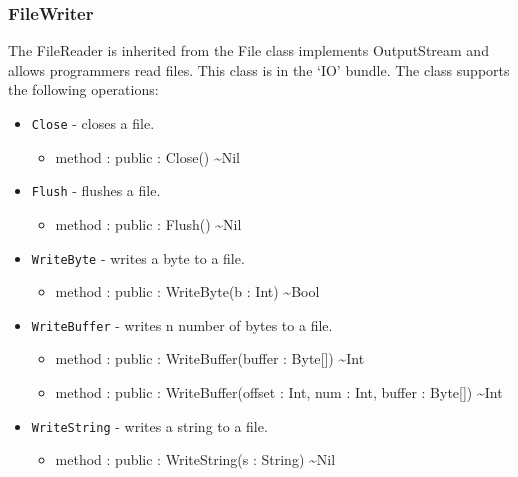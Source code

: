 \documentclass[11pt]{article}
\begin{document}
\subsubsection{FileWriter}
The FileReader is inherited from the File class implements OutputStream and allows programmers
read files.  This class is in the `IO' bundle.  The class supports the
following operations:
\begin{itemize}
\item \texttt{Close} - closes a file.
  \begin{itemize}
  \item method : public : Close() \textasciitilde Nil
  \end{itemize}
\item \texttt{Flush} - flushes a file.
  \begin{itemize}
  \item method : public : Flush() \textasciitilde Nil
  \end{itemize}
\item \texttt{WriteByte} - writes a byte to a file.
  \begin{itemize}
  \item method : public : WriteByte(b : Int) \textasciitilde Bool
  \end{itemize}
\item \texttt{WriteBuffer} - writes n number of bytes to a file.
  \begin{itemize}
  \item method : public : WriteBuffer(buffer : Byte[]) \textasciitilde Int
  \item method : public : WriteBuffer(offset : Int, num : Int, buffer
    : Byte[]) \textasciitilde Int
  \end{itemize}
\item \texttt{WriteString} - writes a string to a file.
  \begin{itemize}
  \item method : public : WriteString(s : String) \textasciitilde Nil
  \end{itemize}
\end{itemize}
\end{document}

